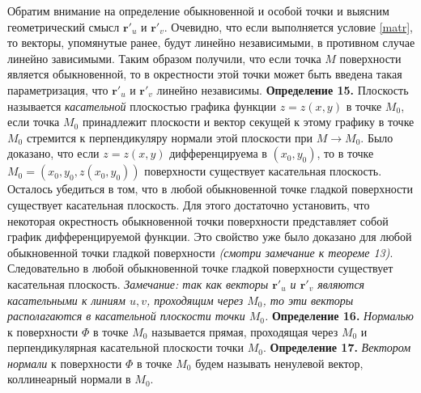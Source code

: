 \documentclass[12pt,a4paper]{article}
\begin{document}
	\newline
	\newline
	Обратим внимание на определение обыкновенной и особой точки и выясним геометрический смысл $\textbf{r}'_{u}$ и $\textbf{r}'_{v}$. Очевидно, что если выполняется условие \eqref{matr}, то векторы, упомянутые ранее, будут линейно независимыми, в противном случае линейно зависимыми.
	\newline
	Таким образом получили, что если точка $M$ поверхности является обыкновенной, то в окрестности этой точки может быть введена такая параметризация, что $\textbf{r}'_{u}$ и $\textbf{r}'_{v}$ линейно независимы.
	\newline
	\newline
	\textbf{Определение 15.} Плоскость называется \textit{касательной} плоскостью графика функции $z = z(x, y)$ в точке $M_{0}$, если точка $M_{0}$ принадлежит плоскости и вектор секущей к этому графику в точке $M_{0}$ стремится к перпендикуляру нормали этой плоскости при $M \rightarrow M_{0}$.
	\newline
	\newline
	Было доказано, что если $z = z(x, y)$ дифференцируема в $(x_{0}, y_{0})$, то в точке $M_{0} = (x_{0}, y_{0}, z(x_{0}, y_{0}))$ поверхности существует касательная плоскость.
	\newline
	Осталось убедиться в том, что в любой обыкновенной точке гладкой поверхности существует касательная плоскость. Для этого достаточно установить, что некоторая окрестность обыкновенной точки поверхности представляет собой график дифференцируемой функции. Это свойство уже было доказано для любой обыкновенной точки гладкой поверхности \textit{(смотри замечание к теореме 13)}. Следовательно в любой обыкновенной точке гладкой поверхности существует касательная плоскость.
	\newline
	\textit{Замечание: так как векторы $\textbf{r}'_{u}$ и $\textbf{r}'_{v}$ являются касательными к линиям $u, v$, проходящим через $M_{0}$, то эти векторы располагаются в касательной плоскости точки $M_{0}$.}
	\newline
	\newline
	\textbf{Определение 16.} \textit{Нормалью} к поверхности $\Phi$ в точке $M_{0}$ называется прямая, проходящая через $M_{0}$ и перпендикулярная касательной плоскости точки $M_{0}$.
	\newline
	\newline
	\textbf{Определение 17.} \textit{Вектором нормали} к поверхности $\Phi$ в точке $M_{0}$ будем называть ненулевой вектор, коллинеарный нормали в $M_{0}$.
\end{document}
